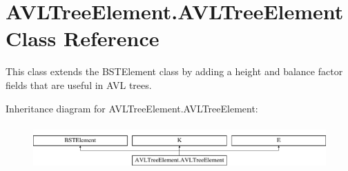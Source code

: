 \hypertarget{class_a_v_l_tree_element_1_1_a_v_l_tree_element}{}\section{A\+V\+L\+Tree\+Element.\+A\+V\+L\+Tree\+Element Class Reference}
\label{class_a_v_l_tree_element_1_1_a_v_l_tree_element}


This class extends the B\+S\+T\+Element class by adding a height and balance factor fields that are useful in A\+VL trees.  


Inheritance diagram for A\+V\+L\+Tree\+Element.\+A\+V\+L\+Tree\+Element\+:\begin{figure}[H]
\begin{center}
\leavevmode
\includegraphics[height=1.744548cm]{class_a_v_l_tree_element_1_1_a_v_l_tree_element}
\end{center}
\end{figure}
